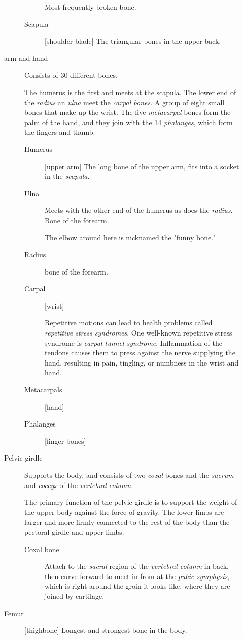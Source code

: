 \documentclass[11pt]{article}
\begin{document}
\begin{description}
\begin{description}
\begin{description}
Most frequently broken bone.
\item[{Scapula}] [shoulder blade] The triangular bones in the upper back.
\end{description}
\item[{arm and hand}] Consists of 30 different bones.

The humerus is the first and meets at the scapula. The lower end of
the \emph{radius} an \emph{ulna} meet the \emph{carpal bones}. A group of eight
small bones that make up the wrist. The five \emph{metacarpal} bones form
the palm of the hand, and they join with the 14 \emph{phalanges}, which
form the fingers and thumb.
\begin{description}
\item[{Humerus}] [upper arm] The long bone of the upper arm, fits into a socket in the
\emph{scapula}.
\item[{Ulna}] Meets with the other end of the humerus as does the \emph{radius}.
Bone of the forearm.

The elbow around here is nicknamed the "funny bone."
\item[{Radius}] bone of the forearm.
\item[{Carpal}] [wrist]

Repetitive motions can lead to health problems called \emph{repetitive
stress syndromes}. One well-known repetitive stress syndrome is
\emph{carpal tunnel syndrome}. Inflammation of the tendons causes them
to press against the nerve supplying the hand, resulting in pain,
tingling, or numbness in the wrist and hand.
\item[{Metacarpals}] [hand]
\item[{Phalanges}] [finger bones]
\end{description}
\item[{Pelvic girdle}] Supports the body, and consists of two \emph{coxal} bones
and the \emph{sacrum} and \emph{coccyx} of the \emph{vertebral column}. 

The primary function of the pelvic girdle is to support the weight of
the upper body against the force of gravity. The lower limbs are
larger and more firmly connected to the rest of the body than the
pectoral girdle and upper limbs.
\begin{description}
\item[{Coxal bone}] Attach to the \emph{sacral} region of the \emph{vertebral column} in
back, then curve forward to meet in from at the \emph{pubic symphysis},
which is right around the groin it looks like, where they are joined
by cartilage.
\end{description}
\item[{Femur}] [thighbone] Longest and strongest bone in the body. 


\end{description}
\end{description}
\end{document}
